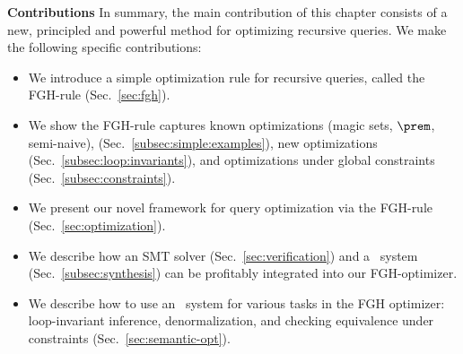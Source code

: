 {\bf Contributions} In summary, the main contribution of this chapter
consists of a new, principled and powerful method for optimizing
recursive queries.  We make the following specific contributions:
%
\begin{itemize}
\item We introduce a simple optimization rule for recursive queries,
  called the FGH-rule (Sec.~\ref{sec:fgh}).
\item We show the FGH-rule captures known optimizations (magic
  sets, $\prem$, semi-naive), (Sec.~\ref{subsec:simple:examples}), 
  new optimizations (Sec.~\ref{subsec:loop:invariants}), and
  optimizations under global constraints
  (Sec.~\ref{subsec:constraints}).
\item We present our novel framework for query optimization via
the FGH-rule  (Sec.~\ref{sec:optimization}).
\item We describe how an SMT solver
(Sec.~\ref{sec:verification}) and a
\cegis\ system (Sec.~\ref{subsec:synthesis})
can be profitably integrated into our FGH-optimizer.
\item We describe how to use an \eqsat\ system for various tasks in
  the FGH optimizer: loop-invariant inference, denormalization,
  and checking equivalence under constraints (Sec.~\ref{sec:semantic-opt}).
\end{itemize}


